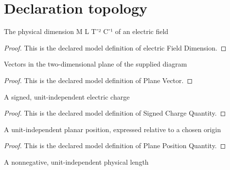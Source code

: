 \section{Declaration topology}
\begin{definition}
  \label{def:physics:phyx-mini-0903:phyxminiproblems-problemphyxmini0903-electricfielddimension}
  The physical dimension M L T⁻² C⁻¹ of an electric field
\end{definition}
\begin{proof}
  This is the declared model definition of electric Field Dimension.
\end{proof}
\begin{definition}
  \label{def:physics:phyx-mini-0903:phyxminiproblems-problemphyxmini0903-planevector}
  Vectors in the two-dimensional plane of the supplied diagram
\end{definition}
\begin{proof}
  This is the declared model definition of Plane Vector.
\end{proof}
\begin{definition}
  \label{def:physics:phyx-mini-0903:phyxminiproblems-problemphyxmini0903-signedchargequantity}
  A signed, unit-independent electric charge
\end{definition}
\begin{proof}
  This is the declared model definition of Signed Charge Quantity.
\end{proof}
\begin{definition}
  \label{def:physics:phyx-mini-0903:phyxminiproblems-problemphyxmini0903-planepositionquantity}
  A unit-independent planar position, expressed relative to a chosen origin
\end{definition}
\begin{proof}
  This is the declared model definition of Plane Position Quantity.
\end{proof}
\begin{definition}
  \label{def:physics:phyx-mini-0903:phyxminiproblems-problemphyxmini0903-lengthquantity}
  A nonnegative, unit-independent physical length
\end{definition}

